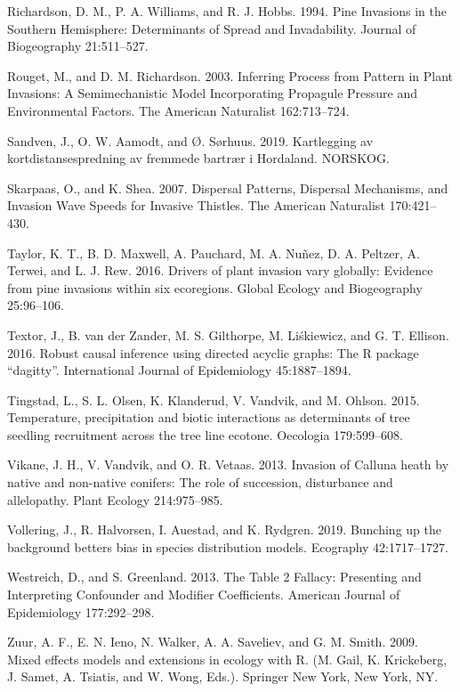 \documentclass[
]{article}
\begin{document}
\leavevmode\hypertarget{ref-richardsonPineInvasionsSouthern1994}{}%
Richardson, D. M., P. A. Williams, and R. J. Hobbs. 1994. Pine Invasions in the Southern Hemisphere: Determinants of Spread and Invadability. Journal of Biogeography 21:511--527.

\leavevmode\hypertarget{ref-rougetInferringProcessPattern2003}{}%
Rouget, M., and D. M. Richardson. 2003. Inferring Process from Pattern in Plant Invasions: A Semimechanistic Model Incorporating Propagule Pressure and Environmental Factors. The American Naturalist 162:713--724.

\leavevmode\hypertarget{ref-sandvenKartleggingAvKortdistansespredning2019}{}%
Sandven, J., O. W. Aamodt, and Ø. Sørhuus. 2019. Kartlegging av kortdistansespredning av fremmede bartrær i Hordaland. NORSKOG.

\leavevmode\hypertarget{ref-skarpaasDispersalPatternsDispersal2007}{}%
Skarpaas, O., and K. Shea. 2007. Dispersal Patterns, Dispersal Mechanisms, and Invasion Wave Speeds for Invasive Thistles. The American Naturalist 170:421--430.

\leavevmode\hypertarget{ref-taylorDriversPlantInvasion2016}{}%
Taylor, K. T., B. D. Maxwell, A. Pauchard, M. A. Nuñez, D. A. Peltzer, A. Terwei, and L. J. Rew. 2016. Drivers of plant invasion vary globally: Evidence from pine invasions within six ecoregions. Global Ecology and Biogeography 25:96--106.

\leavevmode\hypertarget{ref-textorRobustCausalInference2016}{}%
Textor, J., B. van der Zander, M. S. Gilthorpe, M. Liśkiewicz, and G. T. Ellison. 2016. Robust causal inference using directed acyclic graphs: The R package ``dagitty''. International Journal of Epidemiology 45:1887--1894.

\leavevmode\hypertarget{ref-tingstadTemperaturePrecipitationBiotic2015}{}%
Tingstad, L., S. L. Olsen, K. Klanderud, V. Vandvik, and M. Ohlson. 2015. Temperature, precipitation and biotic interactions as determinants of tree seedling recruitment across the tree line ecotone. Oecologia 179:599--608.

\leavevmode\hypertarget{ref-vikaneInvasionCallunaHeath2013}{}%
Vikane, J. H., V. Vandvik, and O. R. Vetaas. 2013. Invasion of Calluna heath by native and non-native conifers: The role of succession, disturbance and allelopathy. Plant Ecology 214:975--985.

\leavevmode\hypertarget{ref-volleringBunchingBackgroundBetters2019}{}%
Vollering, J., R. Halvorsen, I. Auestad, and K. Rydgren. 2019. Bunching up the background betters bias in species distribution models. Ecography 42:1717--1727.

\leavevmode\hypertarget{ref-westreichTableFallacyPresenting2013}{}%
Westreich, D., and S. Greenland. 2013. The Table 2 Fallacy: Presenting and Interpreting Confounder and Modifier Coefficients. American Journal of Epidemiology 177:292--298.

\leavevmode\hypertarget{ref-zuurMixedEffectsModels2009}{}%
Zuur, A. F., E. N. Ieno, N. Walker, A. A. Saveliev, and G. M. Smith. 2009. Mixed effects models and extensions in ecology with R. (M. Gail, K. Krickeberg, J. Samet, A. Tsiatis, and W. Wong, Eds.). Springer New York, New York, NY.
\end{document}
